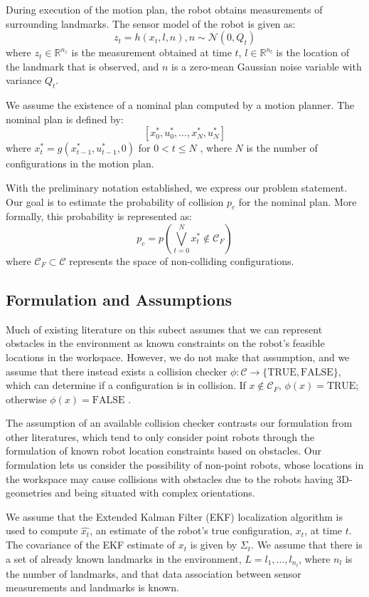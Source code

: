\documentclass[journal]{IEEEtran}
\begin{document}
During execution of the motion plan, the robot obtains measurements of surrounding landmarks. The sensor model of the robot is given as:
$$z_t = h(x_t,l,n), n \sim \mathcal{N}(0,Q_t)$$
where $z_t \in \mathbb{R}^{n_z}$ is the measurement obtained at time $t$, $l \in \mathbb{R}^{n_l}$ is the location of the landmark that is observed, and $n$ is a zero-mean Gaussian noise variable with variance $Q_t$.

We assume the existence of a nominal plan computed by a motion planner. The nominal plan is defined by:
$$[x_0^*,u_0^*,...,x_N^*,u_N^*]$$
where $x_t^* = g(x_{t-1}^*,u_{t-1}^*,0)$ for $0 < t \leq N$ , where $N$ is the number of configurations in the motion plan.

With the preliminary notation established, we express our problem statement. Our goal is to estimate the probability of collision $p_c$ for the nominal plan. More formally, this probability is represented as:
$$p_c = p\left(\bigvee\limits_{t=0}^N x_t^* \notin \mathcal{C}_F \right)$$
where $\mathcal{C}_F \subset \mathcal{C}$ represents the space of non-colliding configurations.

\subsection{Formulation and Assumptions}

Much of existing literature on this subect assumes that we can represent obstacles in the environment as known constraints on the robot's feasible locations in the workspace. However, we do not make that assumption, and we assume that there instead exists a collision checker $\phi: \mathcal{C} \rightarrow \{\text{TRUE},\text{FALSE}\}$, which can determine if a configuration is in collision. If $x\notin \mathcal{C}_F$, $\phi(x) = \text{TRUE}$; otherwise $\phi(x) = \text{FALSE}$ \cite{IEEEhowto:lavalle}.

The assumption of an available collision checker contrasts our formulation from other literatures, which tend to only consider point robots through the formulation of known robot location constraints based on obstacles. Our formulation lets us consider the possibility of non-point robots, whose locations in the workspace may cause collisions with obstacles due to the robots having 3D-geometries and being situated with complex orientations.

We assume that the Extended Kalman Filter (EKF) localization algorithm \cite{IEEEhowto:thrun} is used to compute $\hat{x_t}$, an estimate of the robot's true configuration, $x_t$, at time $t$. The covariance of the EKF estimate of $x_t$ is given by $\Sigma_t$. We assume that there is a set  of already known landmarks in the environment, $L = {l_1,...,l_{n_l}}$, where $n_l$ is the number of landmarks, and that data association between sensor measurements and landmarks is known.
\end{document}
